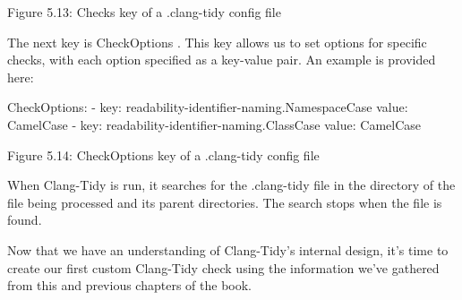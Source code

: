 \begin{center}
Figure 5.13: Checks key of a .clang-tidy config file
\end{center}

The next key is CheckOptions . This key allows us to set options for specific checks, with each option specified as a key-value pair. An example is provided here:

\begin{shell}
CheckOptions:
- key: readability-identifier-naming.NamespaceCase
  value: CamelCase
- key: readability-identifier-naming.ClassCase
  value: CamelCase
\end{shell}

\begin{center}
Figure 5.14: CheckOptions key of a .clang-tidy config file
\end{center}

When Clang-Tidy is run, it searches for the .clang-tidy file in the directory of the file being processed and its parent directories. The search stops when the file is found.

Now that we have an understanding of Clang-Tidy's internal design, it's time to create our first custom Clang-Tidy check using the information we've gathered from this and previous chapters of the book.




























